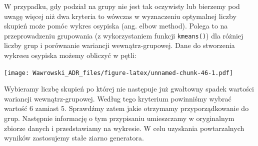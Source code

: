 \documentclass[]{book}
\newenvironment{Shaded}{\begin{snugshade}}{\end{snugshade}}
\newcommand{\CommentTok}[1]{\textcolor[rgb]{0.56,0.35,0.01}{\textit{#1}}}
\newcommand{\ControlFlowTok}[1]{\textcolor[rgb]{0.13,0.29,0.53}{\textbf{#1}}}
\newcommand{\DataTypeTok}[1]{\textcolor[rgb]{0.13,0.29,0.53}{#1}}
\newcommand{\DecValTok}[1]{\textcolor[rgb]{0.00,0.00,0.81}{#1}}
\newcommand{\KeywordTok}[1]{\textcolor[rgb]{0.13,0.29,0.53}{\textbf{#1}}}
\newcommand{\NormalTok}[1]{#1}
\newcommand{\OperatorTok}[1]{\textcolor[rgb]{0.81,0.36,0.00}{\textbf{#1}}}
\newcommand{\StringTok}[1]{\textcolor[rgb]{0.31,0.60,0.02}{#1}}
\begin{document}
W przypadku, gdy podział na grupy nie jest tak oczywisty lub bierzemy pod uwagę więcej niż dwa kryteria to wówczas w wyznaczeniu optymalnej liczby skupień może pomóc wykres osypiska (ang. elbow method). Polega to na przeprowadzeniu grupowania (z wykorzystaniem funkcji \texttt{kmeans()}) dla różniej liczby grup i porównanie wariancji wewnątrz-grupowej. Dane do stworzenia wykresu osypiska możemy obliczyć w pętli:

\begin{Shaded}
\end{Shaded}

\texttt{[image: Wawrowski\_ADR\_files/figure-latex/unnamed-chunk-46-1.pdf]}

Wybieramy liczbę skupień po której nie następuje już gwałtowny spadek wartości wariancji wewnątrz-grupowej. Według tego kryterium powinniśmy wybrać wartość 6 zamiast 5. Sprawdźmy zatem jakie otrzymamy przyporządkowanie do grup. Następnie informację o tym przypisaniu umieszczamy w oryginalnym zbiorze danych i przedstawiamy na wykresie. W celu uzyskania powtarzalnych wyników zastosujemy stałe ziarno generatora.

\begin{Shaded}
\end{Shaded}
\end{document}
